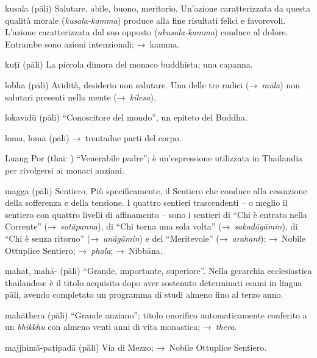 \begin{glossarydescription}
\item[kusala] (pāli) Salutare, abile, buono, meritorio. Un'azione caratterizzata
  da questa qualità morale (\emph{kusala-kamma}) produce alla fine risultati
  felici e favorevoli. L'azione caratterizzata dal suo opposto
  (\emph{akusala-kamma}) conduce al dolore. Entrambe sono azioni intenzionali;
  →~kamma.

\item[kuṭī] (pāli) La piccola dimora del monaco buddhista; una capanna.


\item[lobha] (pāli) Avidità, desiderio non salutare. Una delle tre radici
  (→~\emph{mūla}) non salutari presenti nella mente (→~\emph{kilesa}).

\item[lokavidū] (pāli) ``Conoscitore del mondo'', un epiteto del Buddha.

\item[loma, lomā] (pāli) →~trentadue parti del corpo.

\item[Luang Por] (thai: ) ``Venerabile padre''; è un'espressione
  utilizzata in Thailandia per rivolgersi ai monaci anziani.


\item[magga] (pāli) Sentiero. Più specificamente, il Sentiero che conduce alla
  cessazione della sofferenza e della tensione. I quattro sentieri trascendenti
  -- o meglio il sentiero con quattro livelli di affinamento -- sono i sentieri
  di ``Chi è entrato nella Corrente'' (→~\emph{sotāpanna}), di ``Chi torna una
  sola volta'' (→~\emph{sakadāgāmin}), di ``Chi è senza ritorno''
  (→~\emph{anāgāmin}) e del ``Meritevole'' (→~\emph{arahant}); →~Nobile Ottuplice
  Sentiero; →~\emph{phala}; →~Nibbāna.

\item[mahat, mahā-] (pāli) ``Grande, importante, superiore''. Nella gerarchia
  ecclesiastica thailandese è il titolo acquisito dopo aver sostenuto
  determinati esami in lingua pāli, avendo completato un programma di studi
  almeno fino al terzo anno.

\item[mahāthera] (pāli) ``Grande anziano''; titolo onorifico automaticamente
  conferito a un \emph{bhikkhu} con almeno venti anni di vita monastica;
  →~\emph{thera}.

\item[majjhimā-paṭipadā] (pāli) Via di Mezzo; →~Nobile Ottuplice Sentiero.


\end{glossarydescription}
